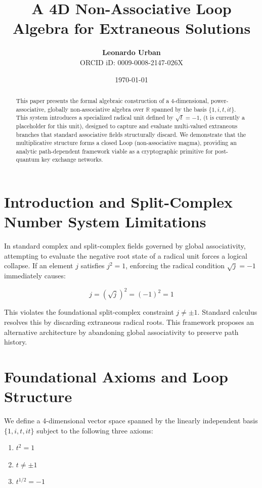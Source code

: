 \documentclass[11pt,a4paper]{article}
\title{\textbf{A 4D Non-Associative Loop Algebra for Extraneous Solutions}}
\author{\textbf{Leonardo Urban} \\ \small{ORCID iD: 0009-0008-2147-026X}}
\date{\today}
\begin{document}
\maketitle


\begin{abstract}

This paper presents the formal algebraic construction of a 4-dimensional, power-associative, globally non-associative algebra over $\mathbb{R}$ spanned by the basis $\{1, i, t, it\}$. This system introduces a specialized radical unit defined by $\sqrt{t} = -1$, (t is currently a placeholder for this unit), designed to capture and evaluate multi-valued extraneous branches that standard associative fields structurally discard. We demonstrate that the multiplicative structure forms a closed Loop (non-associative magma), providing an analytic path-dependent framework viable as a cryptographic primitive for post-quantum key exchange networks.

\end{abstract}


\section{Introduction and Split-Complex Number System Limitations}

In standard complex and split-complex fields governed by global associativity, attempting to evaluate the negative root state of a radical unit forces a logical collapse. If an element $j$ satisfies $j^2 = 1$, enforcing the radical condition $\sqrt{j} = -1$ immediately causes:

\begin{equation}
j = (\sqrt{j})^2 = (-1)^2 = 1
\end{equation}

This violates the foundational split-complex constraint $j \neq \pm 1$. Standard calculus resolves this by discarding extraneous radical roots. This framework proposes an alternative architecture by abandoning global associativity to preserve path history.


\section{Foundational Axioms and Loop Structure}

We define a 4-dimensional vector space spanned by the linearly independent basis $\{1, i, t, it\}$ subject to the following three axioms:

\begin{enumerate}

    \item $t^2 = 1$

    \item $t \neq \pm 1$

    \item $t^{1/2} = -1$

\end{enumerate}
\end{document}
